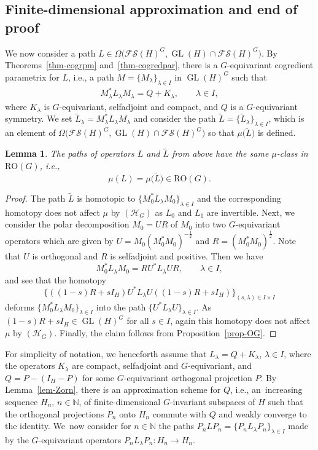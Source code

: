 \documentclass[pdftex]{sigma}
\numberwithin{equation}{section}
\newtheorem{Lemma}[Theorem]{Lemma}
\theoremstyle{definition}
\DeclareMathOperator{\GL}{GL}
\begin{document}
\subsection{Finite-dimensional approximation and end of proof}

We now consider a path $L\in\Omega\bigl(\mathcal{FS}(H)^G,\GL(H)\cap\mathcal{FS}(H)^G\bigr)$. By Theorems~\ref{thm-cogrpm} and~\ref{thm-cogredpar}, there is a $G$-equivariant cogredient parametrix for $L$, i.e., a path $M=\{M_\lambda\}_{\lambda\in I}$ in $\GL(H)^G$ such that
\begin{align*}
M^\ast_\lambda L_\lambda M_\lambda= Q+K_\lambda,\qquad \lambda\in I,
\end{align*}
where $K_\lambda$ is $G$-equivariant, selfadjoint and compact, and $Q$ is a $G$-equivariant symmetry. We set $\tilde{L}_\lambda=M^\ast_\lambda L_\lambda M_\lambda$ and consider the path $\tilde{L}=\{\tilde{L}_\lambda\}_{\lambda\in I}$, which is an element of $\Omega\bigl(\mathcal{FS}(H)^G,\GL(H)\cap\mathcal{FS}(H)^G\bigr)$ so that $\mu\bigl(\tilde{L}\bigr)$ is defined.

\begin{Lemma}
The paths of operators $L$ and $\tilde{L}$ from above have the same $\mu$-class in $\mathrm{RO}(G)$, i.e.,
\[\mu(L)=\mu\bigl(\tilde{L}\bigr)\in \mathrm{RO}(G).\]
\end{Lemma}

\begin{proof}
The path $\tilde{L}$ is homotopic to $\{M^\ast_0L_\lambda M_0\}_{\lambda\in I}$ and the corresponding homotopy does not affect $\mu$ by $(\mathcal{H}_G)$ as $L_0$ and $L_1$ are invertible. Next, we consider the polar decomposition $M_0=UR$ of $M_0$ into two $G$-equivariant operators which are given by $U=M_0(M^\ast_0M_0)^{-\frac{1}{2}}$ and $R=(M^\ast_0M_0)^\frac{1}{2}$. Note that $U$ is orthogonal and $R$ is selfadjoint and positive. Then we have
\[M^\ast_0L_\lambda M_0=RU^\ast L_\lambda UR,\qquad\lambda\in I,\]
and see that the homotopy
\[\{((1-s)R+sI_H)U^\ast L_\lambda U((1-s)R+sI_H)\}_{(s,\lambda)\in I\times I}\]
deforms $\{M^\ast_0L_\lambda M_0\}_{\lambda\in I}$ into the path $\{U^\ast L_\lambda U\}_{\lambda\in I}$. As $(1-s)R+sI_H\in\GL(H)^G$ for all $s\in I$, again this homotopy does not affect $\mu$ by $(\mathcal{H}_G)$. Finally, the claim follows from Pro\-po\-si\-tion~\ref{prop-OG}.
\end{proof}

For simplicity of notation, we henceforth assume that $L_\lambda=Q+K_\lambda$, $\lambda\in I$, where the operators $K_\lambda$ are compact, selfadjoint and $G$-equivariant, and $Q=P-(I_H-P)$ for some $G$\nobreakdash-equiv\-ari\-ant orthogonal projection $P$. By Lemma~\ref{lem-Zorn}, there is an approximation scheme for $Q$, i.e., an~increasing sequence $H_n$, $n\in\mathbb{N}$, of finite-dimensional $G$-invariant subspaces of $H$ such that the orthogonal projections $P_n$ onto $H_n$ commute with $Q$ and weakly converge to the identity. We~now consider for $n\in\mathbb{N}$ the paths $P_nLP_n=\{P_nL_\lambda P_n\}_{\lambda\in I}$ made by the $G$-equivariant operators $P_nL_\lambda P_n \colon H_n\rightarrow H_n$.
\end{document}
